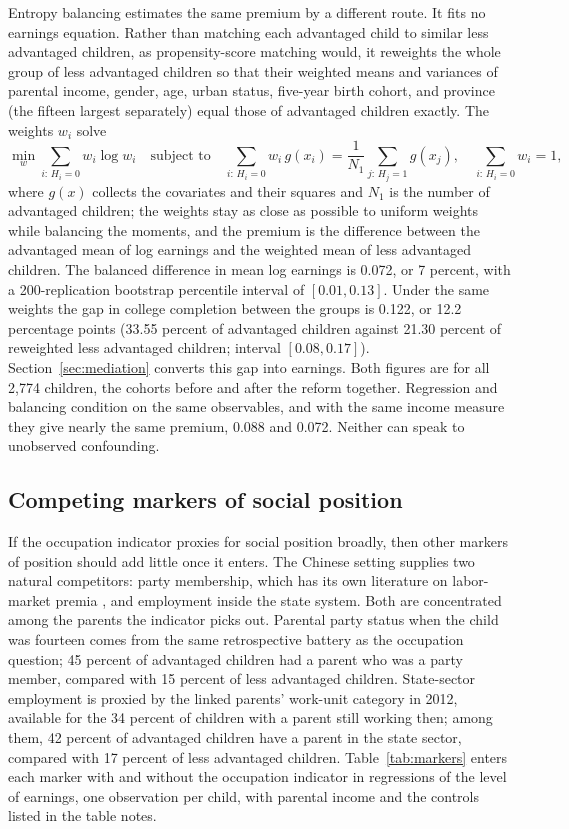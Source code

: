 \documentclass[11pt]{article}
\begin{document}
Entropy balancing \citep{Hainmueller2012} estimates the same premium by
a different route. It fits no earnings equation. Rather than matching each advantaged child to similar
less advantaged children, as propensity-score matching would, it reweights the whole
group of less advantaged children so that their weighted means and variances
of parental income, gender, age, urban status, five-year birth cohort, and province (the fifteen largest separately)
equal those of advantaged children exactly. The weights $w_i$ solve
\begin{equation}
\min_{w} \sum_{i:\, H_i = 0} w_i \log w_i
\quad\text{subject to}\quad
\sum_{i:\, H_i = 0} w_i\, g(x_i) = \frac{1}{N_1}\sum_{j:\, H_j = 1} g(x_j),
\quad \sum_{i:\, H_i = 0} w_i = 1,
\label{eq:ebal}
\end{equation}
where $g(x)$ collects the covariates and their squares and $N_1$ is the number of advantaged children; the weights stay as
close as possible to uniform weights while balancing the moments, and
the premium is the difference between the advantaged mean of log
earnings and the weighted mean of less advantaged children. The balanced difference in mean log
earnings is 0.072, or 7 percent, with a 200-replication bootstrap percentile interval of $[0.01, 0.13]$. Under the same weights the
gap in college completion between the groups is 0.122, or 12.2 percentage points (33.55 percent of advantaged children against 21.30 percent of reweighted less advantaged children; interval $[0.08, 0.17]$). Section~\ref{sec:mediation} converts this gap into earnings. Both figures are for all 2,774 children, the cohorts before and after the reform together. Regression and balancing condition on the
same observables, and with the same income measure they give nearly the
same premium, 0.088 and 0.072. Neither can speak to unobserved
confounding.

\subsection{Competing markers of social position}
\label{sec:class}

If the occupation indicator proxies for social position broadly, then other
markers of position should add little once it enters. The Chinese
setting supplies two natural competitors: party membership, which has its own literature on labor-market premia \citep{LiEtAl2007}, and employment inside the state system. Both are concentrated among the parents the indicator picks out. Parental party
status when the child was fourteen comes from the same retrospective
battery as the occupation question; 45 percent of advantaged children had a parent who was a party member, compared with 15 percent of less advantaged children.
State-sector employment is proxied by the linked parents' work-unit
category in 2012, available for the 34 percent of children with a
parent still working then; among them, 42 percent of advantaged children have a parent in the state sector, compared with 17 percent of less advantaged children. Table~\ref{tab:markers} enters each marker
with and without the occupation indicator in regressions of the level of earnings, one observation per child, with parental income and the controls listed in the table notes.
\end{document}
